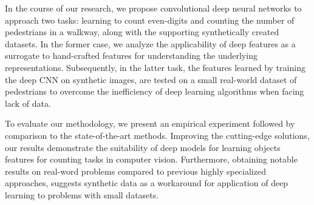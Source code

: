 \documentclass[11pt, oneside]{book}
\begin{document}
In the course of our research, we propose convolutional deep neural networks to approach two tasks: learning to count even-digits and counting the number of pedestrians in a walkway, along with the supporting synthetically created datasets. In the former case, we analyze the applicability of deep features as a surrogate to hand-crafted features for understanding the underlying representations. Subsequently, in the latter task, the features learned by training the deep CNN on synthetic images, are tested on a small real-world dataset of pedestrians to overcome the inefficiency of deep learning algorithms when facing lack of data.

To evaluate our methodology, we present an empirical experiment followed by comparison to the state-of-the-art methods. Improving the cutting-edge solutions, our results demonstrate the suitability of deep models for learning objects features for counting tasks in computer vision. Furthermore, obtaining notable results on real-word problems compared to previous highly specialized approaches, suggests synthetic data as a workaround for application of deep learning to problems with small datasets. 

 



     



 


\tableofcontents

\listoffigures

\listoftables



\newpage
{} %

\newpage\null\thispagestyle{empty}\newpage














\vfill
\renewcommand{\bibname}{\refname} %
\addcontentsline{toc}{chapter}{\bibname}





%
\printglossaries %

\vfill
\end{document}
